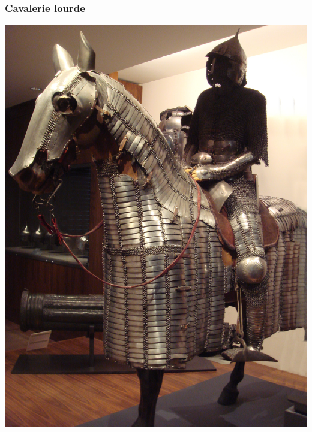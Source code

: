 \documentclass{article}
\begin{document}
\subsubsection{Cavalerie lourde}
\includegraphics[width=0.44\paperwidth]{../ressources/Ottoman_Mamluk_horseman}
\end{document}
